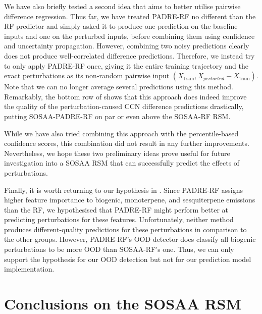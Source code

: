 \newpar We have also briefly tested a second idea that aims to better utilise pairwise difference regression. Thus far, we have treated PADRE-RF no different than the RF predictor and simply asked it to produce one prediction on the baseline inputs and one on the perturbed inputs, before combining them using confidence and uncertainty propagation. However, combining two noisy predictions clearly does not produce well-correlated difference predictions. Therefore, we instead try to only apply PADRE-RF once, giving it the entire training trajectory and the exact perturbations as its non-random pairwise input $(X_{\text{train}}, X_{perturbed} - X_{\text{train}})$. Note that we can no longer average several predictions using this method. Remarkably, the bottom row of  shows that this approach does indeed improve the quality of the perturbation-caused CCN difference predictions drastically, putting SOSAA-PADRE-RF on par or even above the SOSAA-RF RSM.

\newpar While we have also tried combining this approach with the percentile-based confidence scores, this combination did not result in any further improvements. Nevertheless, we hope these two preliminary ideas prove useful for future investigation into a SOSAA RSM that can successfully predict the effects of perturbations.

\newpar Finally, it is worth returning to our hypothesis in . Since PADRE-RF assigns higher feature importance to biogenic, monoterpene, and sesquiterpene emissions than the RF, we hypothesised that PADRE-RF might perform better at predicting perturbations for these features. Unfortunately, neither method produces different-quality predictions for these perturbations in comparison to the other groups. However, PADRE-RF's OOD detector does classify all biogenic perturbations to be more OOD than SOSAA-RF's one. Thus, we can only support the hypothesis for our OOD detection but not for our prediction model implementation.

\section{Conclusions on the SOSAA RSM} \label{txt:sosaa-rsm-conclusions}

